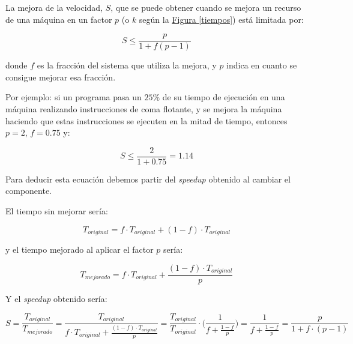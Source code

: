 \documentclass[10pt,a4paper,spanish]{report}
\begin{document}
La mejora de la velocidad, $S$, que se puede obtener cuando se mejora un recurso de una máquina en un factor $p$ (o $k$ según la \hyperref[tiempos]{Figura \ref*{tiempos}}) está limitada por:

\begin{displaymath}
S \leq \frac{p}{1+f(p-1)}
\end{displaymath}

donde $f$ es la fracción del sistema que utiliza la mejora, y $p$ indica en cuanto se consigue mejorar esa fracción. 

Por ejemplo: si un programa pasa un $25\%$ de su tiempo de ejecución en una máquina realizando instrucciones de coma flotante, y se mejora la máquina haciendo que estas instrucciones se ejecuten en la mitad de tiempo, entonces $p=2$, $f=0.75$ y:

\begin{displaymath}
S \leq \frac{2}{1+0.75} = 1.14
\end{displaymath}

\begin{center}
 \par
\end{center}

Para deducir esta ecuación debemos partir del \textit{\textcolor{azul}{speedup}} obtenido al cambiar el componente. 

El tiempo sin mejorar sería:

\begin{displaymath}
    T_{original} = f \cdot T_{original} + (1-f)\cdot T_{original}
\end{displaymath}

y el tiempo mejorado al aplicar el factor $p$ sería:

\begin{displaymath}
    T_{mejorado} = f \cdot T_{original} + \frac{(1-f) \cdot T_{original}}{p}
\end{displaymath}

Y el \textcolor{azul}{\textit{speedup}} obtenido sería:

\begin{displaymath}
    S = \frac{T_{original}}{T_{mejorado}} = \frac{T_{original}}{f \cdot T_{original} + \frac{(1-f)\cdot T_{original}}{p}} = \frac{T_{original}}{T_{original}} \cdot \Bigg(\frac{1}{f + \frac{1-f}{p}} \Bigg)  = \frac{1}{f + \frac{1-f}{p}} = \frac{p}{1 + f\cdot(p-1)}
\end{displaymath}
\end{document}
